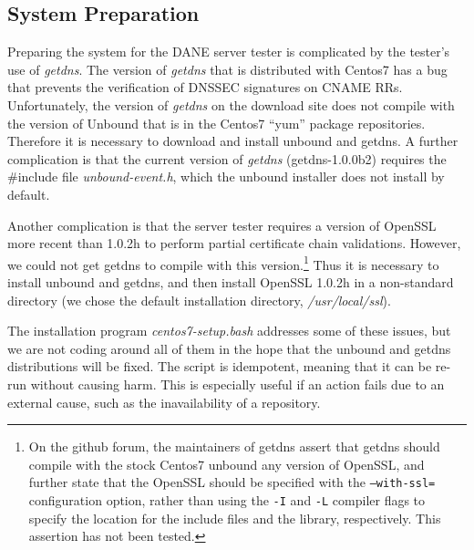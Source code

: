 \documentclass[preprint,3p,11pt]{elsarticle}
\begin{document}
\subsection{System Preparation}

Preparing the system for the DANE server tester is complicated by the
tester's use of \emph{getdns}. The version of \emph{getdns} that is distributed with
Centos7 has a bug that prevents the verification of DNSSEC signatures
on CNAME RRs. Unfortunately, the version of \emph{getdns} on the download
site does not compile with the version of Unbound that is in the
Centos7 ``yum'' package repositories. Therefore it is necessary to
download and install unbound and getdns. A further complication is
that the current version of \emph{getdns} (getdns-1.0.0b2) requires the
\#include file \emph{unbound-event.h}, which the unbound installer does not
install by default. 

Another complication is that the server tester requires a version of
OpenSSL more recent than 1.0.2h to perform partial certificate chain
validations. However, we could not get getdns to compile with this
version.\footnote{On the github forum, the maintainers of getdns
  assert that getdns should compile with the stock Centos7 unbound any
  version of OpenSSL, and further state that the OpenSSL should be
  specified with the \texttt{--with-ssl=} configuration option, rather
  than using the \texttt{-I} and \texttt{-L} compiler flags to specify
  the location for the include files and the library,
  respectively. This assertion has not been tested.} Thus it is
necessary to install unbound and getdns, and then install OpenSSL
1.0.2h in a non-standard directory (we chose the default installation
directory, \emph{/usr/local/ssl}).

The installation program \emph{centos7-setup.bash}
addresses some of these issues, but we are not coding around all of
them in the hope that the unbound and getdns distributions will be
fixed. The script is idempotent, meaning that it can be re-run without
causing harm. This is especially useful if an action fails due to an
external cause, such as the inavailability of a repository.
\end{document}
